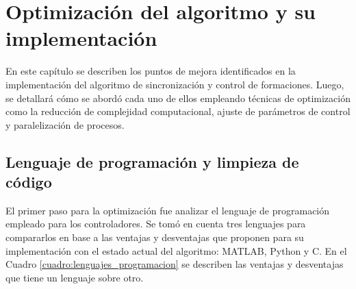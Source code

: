 \chapter{Optimización del algoritmo y su implementación}
En este capítulo se describen los puntos de mejora identificados en la implementación del algoritmo de sincronización y control de formaciones. Luego, se detallará cómo se abordó cada uno de ellos empleando técnicas de optimización como la reducción de complejidad computacional, ajuste de parámetros de control y paralelización de procesos.


\section{Lenguaje de programación y limpieza de código}
El primer paso para la optimización fue analizar el lenguaje de programación empleado para los controladores. Se tomó en cuenta tres lenguajes para compararlos en base a las ventajas y desventajas que proponen para su implementación con el estado actual del algoritmo: MATLAB, Python y C. En el Cuadro \ref{cuadro:lenguajes_programacion} se describen las ventajas y desventajas que tiene un lenguaje sobre otro.

